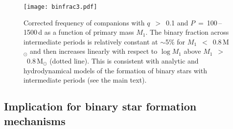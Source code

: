 \documentclass[a4paper,fleqn,usenatbib]{mnras}
\begin{document}
\begin{figure}
\centering
\texttt{[image: binfrac3.pdf]}
\caption{Corrected frequency of companions with $q$~$>$~0.1 and $P$~=~100\,--\,1500\,d as a function of primary mass $M_1$.  The binary fraction across intermediate periods is relatively constant at $\sim$5\% for $M_1$~$<$~0.8\,M$_{\odot}$ and then increases linearly with respect to $\log M_1$ above $M_1$~$>$~0.8\,M$_{\odot}$ (dotted line). This is consistent with analytic and hydrodynamical models of the formation of binary stars with intermediate periods (see the main text).}
\label{binfrac}
\end{figure}



\subsection{Implication for binary star formation mechanisms}
\end{document}
